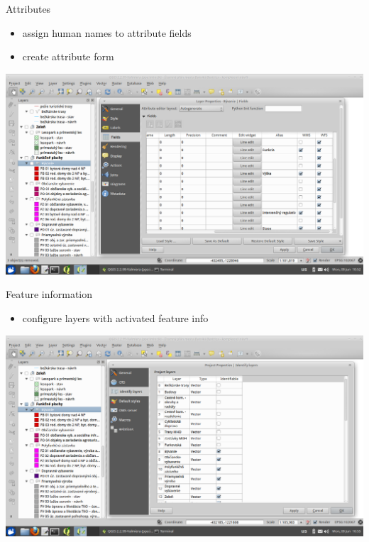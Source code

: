 \documentclass[12pt]{beamer}
\begin{document}
\begin{frame}{Attributes}
	\begin{itemize}
		\item assign human names to attribute fields
		\item create attribute form
	\end{itemize}
	\begin{center}
		\includegraphics[keepaspectratio=true,height=0.6\textheight]{images/real-world-example/project-layer-attributes.png}
	\end{center}
\end{frame}


\begin{frame}{Feature information}
	\begin{itemize}
		\item configure layers with activated feature info
	\end{itemize}
	\begin{center}
		\includegraphics[keepaspectratio=true,height=0.6\textheight]{images/real-world-example/project-feature-info.png}
	\end{center}
\end{frame}
\end{document}
